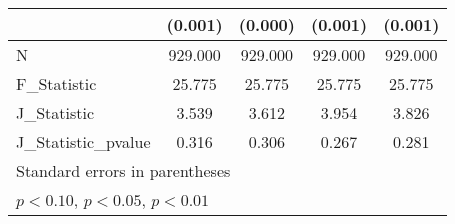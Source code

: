 {\begin{tabular}{l*{4}{c}}
            &     (0.001)         &     (0.000)         &     (0.001)         &     (0.001)         \\
\hline
N           &     929.000         &     929.000         &     929.000         &     929.000         \\
F\_Statistic &      25.775         &      25.775         &      25.775         &      25.775         \\
J\_Statistic &       3.539         &       3.612         &       3.954         &       3.826         \\
J\_Statistic\_pvalue&       0.316         &       0.306         &       0.267         &       0.281         \\
\hline\hline
\multicolumn{5}{l}{\footnotesize Standard errors in parentheses}\\
\multicolumn{5}{l}{\footnotesize \sym{*} \(p<0.10\), \sym{**} \(p<0.05\), \sym{***} \(p<0.01\)}\\
\end{tabular}
}
